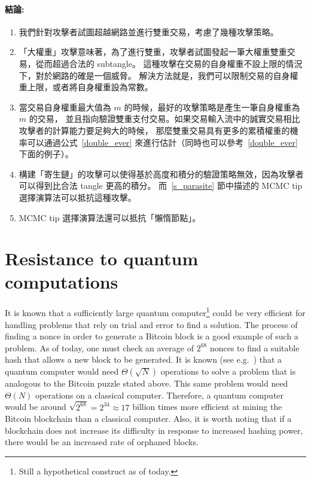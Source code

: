 \documentclass[12pt]{article}
\begin{document}
\begin{CJK}{UTF8}{bkai}
\paragraph{結論:}
\begin{enumerate}
 \item 我們針對攻擊者試圖超越網路並進行雙重交易，考慮了幾種攻擊策略。
 \item 「大權重」攻擊意味著，為了進行雙重，攻擊者試圖發起一筆大權重雙重交易，從而超過合法的 subtangle。
 這種攻擊在交易的自身權重不設上限的情況下，對於網路的確是一個威脅。
 解決方法就是，我們可以限制交易的自身權重上限，或者將自身權重設為常數。
 \item 當交易自身權重最大值為 $m$ 的時候，最好的攻擊策略是產生一筆自身權重為~$m$ 的交易，
 並且指向驗證雙重支付交易。如果交易輸入流中的誠實交易相比攻擊者的計算能力要足夠大的時候，
 那麼雙重交易具有更多的累積權重的機率可以通過公式~\eqref{double_ever} 來進行估計（同時也可以參考~\eqref{double_ever} 下面的例子）。
 \item 構建「寄生鏈」的攻擊可以使得基於高度和積分的驗證策略無效，因為攻擊者可以得到比合法 tangle 更高的積分。
 而~\ref{s_parasite} 節中描述的 MCMC tip 選擇演算法可以抵抗這種攻擊。
\item MCMC tip 選擇演算法還可以抵抗「懶惰節點」。
\end{enumerate}



\section{Resistance to quantum computations}
\label{s_quantum}
It is known that a sufficiently large
 quantum computer\footnote{Still a hypothetical construct as of today.}
  could be very efficient for handling problems
that rely on trial and error to find a solution. The process of finding a nonce
in order to generate a Bitcoin block is a good example 
of such a problem. As of today, one must 
check an average of $2^{68}$ nonces to find a suitable hash
that allows a new block to be generated. 
 It is known (see e.g.~\cite{BHT}) that a quantum computer would need 
$\Theta(\sqrt{N})$ operations to solve a problem that is analogous to 
the Bitcoin puzzle stated above. This same problem would need
~$\Theta(N)$ operations on a classical computer.
Therefore, a quantum computer would be 
around $\sqrt{2^{68}}=2^{34}\approx 17$ billion times
more efficient at mining the Bitcoin blockchain than a classical computer.
Also, it is worth noting that
 if a blockchain does not increase its difficulty in response 
to increased hashing power, there would be an 
increased rate of orphaned blocks.


\end{CJK}
\end{document}
